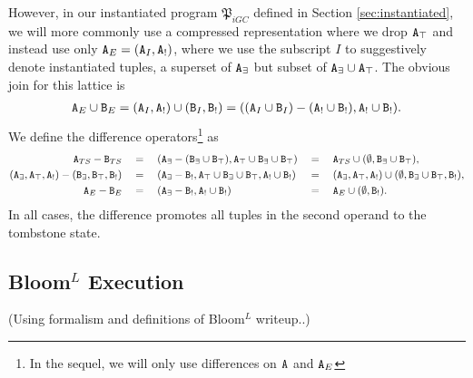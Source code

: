 \documentclass{article}
\numberwithin{equation}{section}
\renewcommand{\tt}[1]{\ifmmode\text{\texttt{#1}}\else\texttt{#1}\fi}
\begin{document}
However, in our instantiated program $\mathfrak{P}_{iGC}$ defined in Section \ref{sec:instantiated}, we will more commonly use a compressed representation where we drop $\tt{A}_\top$ and instead use only $\tt{A}_E = (\tt{A}_I, \tt{A}_!)$, where we use the subscript $I$ to suggestively denote instantiated tuples, a superset of $\tt{A}_\exists$ but subset of $\tt{A}_\exists \cup \tt{A}_\top$.
The obvious join for this lattice is
\begin{align*}
\tt{A}_E \cup \tt{B}_E = (\tt{A}_I, \tt{A}_!) \cup (\tt{B}_I, \tt{B}_!) = ((\tt{A}_I \cup \tt{B}_I) - (\tt{A}_! \cup \tt{B}_!), \tt{A}_! \cup \tt{B}_!).
\end{align*}
We define the difference operators\footnote{
In the sequel, we will only use differences on $\tt{A}$ and $\tt{A}_E$} as
\begin{align*}
\tt{A}_{TS} - \tt{B}_{TS} &\quad=\quad (\tt{A}_\exists - (\tt{B}_\exists \cup \tt{B}_\top), \tt{A}_\top \cup \tt{B}_\exists \cup \tt{B}_\top) &&=\quad \tt{A}_{TS} \cup (\emptyset, \tt{B}_\exists \cup \tt{B}_\top),\\
(\tt{A}_\exists, \tt{A}_\top, \tt{A}_!) - (\tt{B}_\exists, \tt{B}_\top, \tt{B}_!) &\quad=\quad (\tt{A}_\exists - \tt{B}_!, \tt{A}_\top \cup \tt{B}_\exists \cup \tt{B}_\top, \tt{A}_! \cup \tt{B}_!) &&=\quad (\tt{A}_\exists, \tt{A}_\top, \tt{A}_!) \cup (\emptyset, \tt{B}_\exists \cup \tt{B}_\top, \tt{B}_!),\\
\tt{A}_E - \tt{B}_E &\quad=\quad (\tt{A}_\exists - \tt{B}_!, \tt{A}_! \cup \tt{B}_!) &&=\quad \tt{A}_E \cup (\emptyset, \tt{B}_!).
\end{align*}
In all cases, the difference promotes all tuples in the second operand to the tombstone state.


\subsection{Bloom$^L$ Execution}
(Using formalism and definitions of Bloom$^L$ writeup..)
\end{document}
